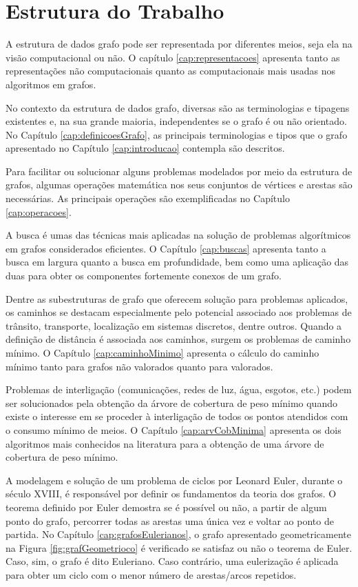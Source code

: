 \documentclass[
12pt,
a4paper,
semrecuonosumario,
sumario = abnt-6027-2012]{report}
\begin{document}
	\section{Estrutura do Trabalho}\label{sec:estruturaTrabalho}
	A estrutura de dados grafo pode ser representada por diferentes meios, seja ela na visão computacional ou não. O capítulo \ref{cap:representacoes} apresenta tanto as representações não computacionais quanto as computacionais mais usadas nos algoritmos em grafos.

	No contexto da estrutura de dados grafo, diversas são as terminologias e tipagens existentes e, na sua grande maioria, independentes se o grafo é ou não orientado. No Capítulo \ref{cap:definicoesGrafo}, as principais terminologias e tipos que o grafo apresentado no Capítulo \ref{cap:introducao} contempla são descritos.

	Para facilitar ou solucionar alguns problemas modelados por meio da estrutura de grafos,  algumas operações matemática nos seus conjuntos de vértices e arestas são necessárias. As principais operações são exemplificadas no Capítulo \ref{cap:operacoes}.

	A busca é umas das técnicas mais aplicadas na solução de problemas algorítmicos em grafos considerados eficientes. O Capítulo \ref{cap:buscas} apresenta tanto a busca em largura quanto a busca em profundidade, bem como uma aplicação das duas para obter os componentes fortemente conexos de um grafo.

	Dentre as subestruturas de grafo que oferecem solução para problemas aplicados, os caminhos se destacam especialmente pelo potencial associado aos problemas de trânsito, transporte, localização em sistemas discretos, dentre outros. Quando a definição de distância é associada aos caminhos, surgem os problemas de caminho mínimo. O Capítulo \ref{cap:caminhoMinimo} apresenta o cálculo do caminho mínimo tanto para grafos não valorados quanto para valorados.

	Problemas de interligação (comunicações, redes de luz, água, esgotos, etc.) podem ser solucionados pela obtenção da árvore de cobertura de peso mínimo quando existe o interesse em se proceder à interligação de todos os pontos atendidos com o consumo mínimo de meios. O Capítulo \ref{cap:arvCobMinima} apresenta os dois algoritmos mais conhecidos na literatura para a obtenção de uma árvore de cobertura de peso mínimo.

	A modelagem e solução de um problema de ciclos por Leonard Euler, durante o século XVIII, é responsável por definir os fundamentos da teoria dos grafos. O teorema definido por Euler demostra se é possível ou não, a partir de algum ponto do grafo, percorrer todas as arestas uma única vez e voltar ao ponto de partida. No Capítulo \ref{cap:grafosEulerianos}, o grafo apresentado geometricamente na Figura \ref{fig:grafGeometrioco} é verificado se satisfaz ou não o teorema de Euler. Caso, sim, o grafo é dito Euleriano. Caso contrário, uma eulerização é aplicada para obter um ciclo com o menor número de arestas/arcos repetidos.
\end{document}
